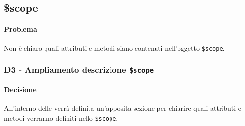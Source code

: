 \subsection{\$scope}\label{pScope}
\paragraph{Problema}
Non è chiaro quali attributi e metodi siano contenuti nell'oggetto \texttt{\$scope}.
\subsubsection{\textbf{D3} - Ampliamento descrizione \texttt{\$scope}}\label{dScope}
\paragraph{Decisione}
All'interno delle \NP verrà definita un'apposita sezione per chiarire quali attributi e metodi verranno definiti nello \texttt{\$scope}.
